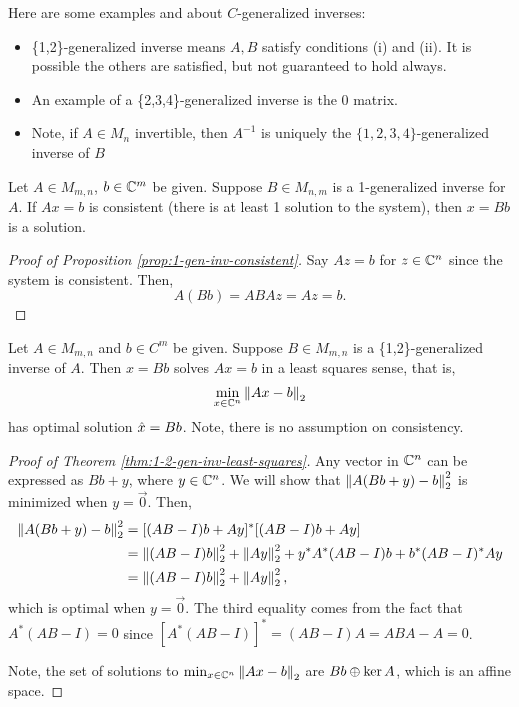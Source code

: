 \begin{remark*}
Here are some examples and about $C$-generalized inverses:
\begin{itemize}
    \item \{1,2\}-generalized inverse means $A,B$ satisfy conditions (i) and (ii). It is possible the others are satisfied, but not guaranteed to hold always.
    \item An example of a \{2,3,4\}-generalized inverse is the 0 matrix.
    \item Note, if $A \in M_n$ invertible, then $A^{-1}$ is uniquely the $\{1,2,3,4\}$-generalized inverse of $B$
\end{itemize}
\end{remark*}

\begin{proposition}
\label{prop:1-gen-inv-consistent}
Let $A \in M_{m,n}$, $b \in \mathbb C^m$ be given. Suppose $B \in M_{n,m}$ is a 1-generalized inverse for $A$. If $Ax = b$ is consistent (there is at least 1 solution to the system), then $x = Bb$ is a solution.
\end{proposition}

\begin{proof}[Proof of Proposition \ref{prop:1-gen-inv-consistent}]
Say $Az = b$ for $z \in \mathbb C^n$ since the system is consistent. Then,
$$
A(Bb) = ABAz = Az = b.
$$
\end{proof}

\begin{theorem}
\label{thm:1-2-gen-inv-least-squares}
Let $A \in M_{m,n}$ and $b \in C^m$ be given. Suppose $B \in M_{m,n}$ is a \{1,2\}-generalized inverse of $A$. Then $x = Bb$ solves $Ax=b$ in a least squares sense, that is,
$$
\min_{x \in \mathbb C^n} \left\lVert Ax-b\right\rVert_2
$$
has optimal solution $\Hat{x} = Bb$. Note, there is no assumption on consistency.
\end{theorem}

\begin{proof}[Proof of Theorem \ref{thm:1-2-gen-inv-least-squares}]
Any vector in $\mathbb C^n$ can be expressed as $Bb+y$, where $y \in \mathbb C^n$. We will show that $\left\lVert A(Bb+y)-b\right\rVert_2^2$ is minimized when $y = \Vec{0}$. Then,
\begin{align*}
    \left\lVert A(Bb+y)-b\right\rVert_2^2 
        &= [(AB-I)b + Ay]^*[(AB-I)b + Ay] \\
        &= \left\lVert(AB-I)b\right\rVert_2^2 + \left\lVert Ay\right\rVert_2^2 + y^*A^*(AB-I)b + b^*(AB-I)^*Ay \\
        &= \left\lVert(AB-I)b\right\rVert_2^2 + \left\lVert Ay\right\rVert_2^2,
\end{align*}
which is optimal when $y = \Vec{0}$. The third equality comes from the fact that $A^*(AB-I) = 0$ since $[A^*(AB-I)]^* = (AB-I)A = ABA-A = 0$.

Note, the set of solutions to $\min_{x \in \mathbb C^n} \left\lVert Ax-b\right\rVert_2$ are $Bb \oplus \operatorname{ker} A$, which is an affine space.
\end{proof}

